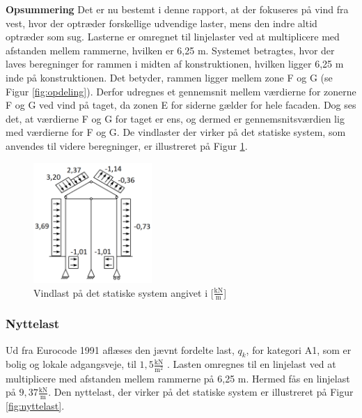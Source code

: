 \textbf{Opsummering}
\newline
Det er nu bestemt i denne rapport, at der fokuseres på vind fra vest, hvor der optræder forskellige udvendige laster, mens den indre altid optræder som sug. Lasterne er omregnet til linjelaster ved at multiplicere med afstanden mellem rammerne, hvilken er 6,25 m. 
\newline
\newline
Systemet betragtes, hvor der laves beregninger for rammen i midten af konstruktionen, hvilken ligger 6,25 m inde på konstruktionen. Det betyder, rammen ligger mellem zone F og G (se Figur \ref{fig:opdeling}). Derfor udregnes et gennemsnit mellem værdierne for zonerne F og G ved vind på taget, da zonen E for siderne gælder for hele facaden. 
Dog ses det, at værdierne F og G for taget er ens, og dermed er gennemsnitsværdien lig med værdierne for F og G. 
\newline \indent{     }  De vindlaster der virker på det statiske system, som anvendes til videre beregninger, er illustreret på Figur \ref{fig:vindlast}. 

\begin{figure}[htbp]
	\centering
	\includegraphics[width=0.4\textwidth]{billeder/vindlast.png}
	\caption{Vindlast på det statiske system angivet i [$\frac{\text{kN}}{\text{m}}$]}
	\label{fig:vindlast}
\end{figure}

\subsubsection{Nyttelast}
Ud fra Eurocode 1991 aflæses den jævnt fordelte last, $q_k$, for kategori A1, som er bolig og lokale adgangsveje, til $1,\!5 \frac{\text{kN}}{\text{m}^2}$ \citep[ tabel 6.2 kapitel 6.3.1.2]{EU91}. Lasten omregnes til en linjelast ved at multiplicere med afstanden mellem rammerne på 6,25 m. Hermed fås en linjelast på $9,\!37 \frac{\text{kN}}{\text{m}}$. 
\newline \indent{     }  Den nyttelast, der virker på det statiske system er illustreret på Figur \ref{fig:nyttelast}.

